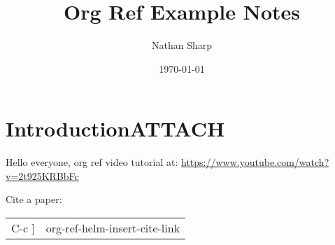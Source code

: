 \documentclass[11pt]{article}
\author{Nathan Sharp}
\date{\today}
\title{Org Ref Example Notes}
\begin{document}
\maketitle
\tableofcontents


\section{Introduction\hfill{}\textsc{ATTACH}}
\label{sec:org18fe31a}
Hello everyone,  org ref video tutorial at: \url{https://www.youtube.com/watch?v=2t925KRBbFc}

Cite a paper: \cite{cisek07_cortic_mechan_action_selec}

\begin{center}
\begin{tabular}{ll}
C-c ] & org-ref-helm-insert-cite-link\\
\end{tabular}
\end{center}




\end{document}
